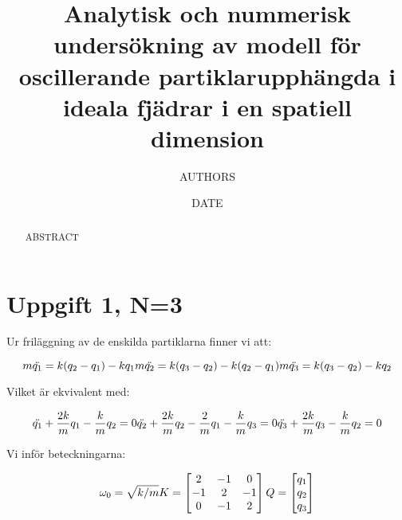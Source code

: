 \documentclass[12pt,a4paper]{article}
\begin{document}

\title{Analytisk och nummerisk undersökning av modell för oscillerande partiklarupphängda i ideala fjädrar i en spatiell dimension}
	\author{AUTHORS}
	\date{DATE}
	\maketitle
	\thispagestyle{empty}

	\begin{abstract}
		ABSTRACT
	\end{abstract}

\newpage

	\tableofcontents
	\thispagestyle{empty}

\newpage

	\setcounter{page}{1}
	\pagestyle{plain}
\section{Uppgift 1, N=3}
Ur friläggning av de enskilda partiklarna finner vi att:

\begin{equation*}
m\ddot{q_1} = k(q_2-q_1)-kq_1 \\
m\ddot{q_2} = k(q_3-q_2)-k(q_2-q_1) \\
m\ddot{q_3} = k(q_3-q_2)-kq_2
\end{equation*}

Vilket är ekvivalent med:

\begin{equation*}
\ddot{q_1} + \frac{2k}{m}q_1 - \frac{k}{m}q_2 = 0 \\
\ddot{q_2} + \frac{2k}{m}q_2-\frac{2}{m}q_1 - \frac{k}{m}q_3 = 0 \\
\ddot{q_3} + \frac{2k}{m}q_3 - \frac{k}{m}q_2=0
\end{equation*}

Vi inför beteckningarna: 

\begin{equation*}
\omega_0=\sqrt{k/m}
K=
\begin{bmatrix}
2 &-1 &0 \\
 -1 & 2 &-1\\
 0 &-1 &2
\end{bmatrix}\\
Q=
\begin{bmatrix}
q_1 \\ 
q_2 \\
q_3
\end{bmatrix}
\end{equation*}
\end{document}
